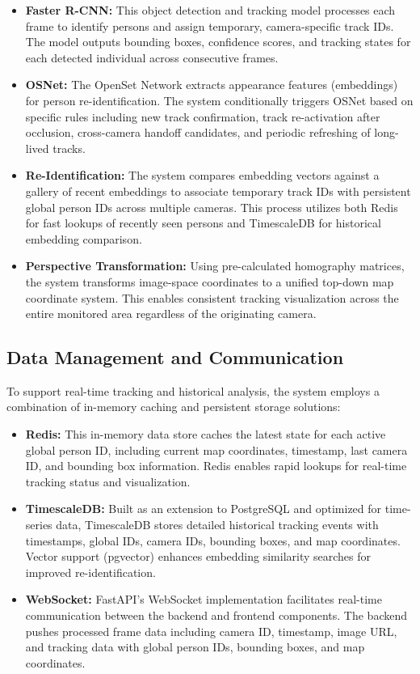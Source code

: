 \begin{itemize}[leftmargin=80pt]
    \item \textbf{Faster R-CNN:} This object detection and tracking model processes each frame to identify persons and assign temporary, camera-specific track IDs. The model outputs bounding boxes, confidence scores, and tracking states for each detected individual across consecutive frames.
    \item \textbf{OSNet:} The OpenSet Network extracts appearance features (embeddings) for person re-identification. The system conditionally triggers OSNet based on specific rules including new track confirmation, track re-activation after occlusion, cross-camera handoff candidates, and periodic refreshing of long-lived tracks.
    \item \textbf{Re-Identification:} The system compares embedding vectors against a gallery of recent embeddings to associate temporary track IDs with persistent global person IDs across multiple cameras. This process utilizes both Redis for fast lookups of recently seen persons and TimescaleDB for historical embedding comparison.
    \item \textbf{Perspective Transformation:} Using pre-calculated homography matrices, the system transforms image-space coordinates to a unified top-down map coordinate system. This enables consistent tracking visualization across the entire monitored area regardless of the originating camera.
\end{itemize}

\subsection{Data Management and Communication}
\label{subsection:data-management-communication} %
To support real-time tracking and historical analysis, the system employs a combination of in-memory caching and persistent storage solutions:

\begin{itemize}[leftmargin=80pt]
    \item \textbf{Redis:} This in-memory data store caches the latest state for each active global person ID, including current map coordinates, timestamp, last camera ID, and bounding box information. Redis enables rapid lookups for real-time tracking status and visualization.
    \item \textbf{TimescaleDB:} Built as an extension to PostgreSQL and optimized for time-series data, TimescaleDB stores detailed historical tracking events with timestamps, global IDs, camera IDs, bounding boxes, and map coordinates. Vector support (pgvector) enhances embedding similarity searches for improved re-identification.
    \item \textbf{WebSocket:} FastAPI's WebSocket implementation facilitates real-time communication between the backend and frontend components. The backend pushes processed frame data including camera ID, timestamp, image URL, and tracking data with global person IDs, bounding boxes, and map coordinates.
\end{itemize}

